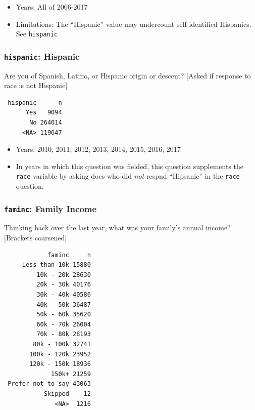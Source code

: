 \documentclass[10pt,article,oneside]{memoir}
\theoremstyle{definition}
\begin{document}
\begin{itemize}
\tightlist
\item
  Years: All of 2006-2017
\item
  Limitations: The ``Hispanic'' value may undercount self-identified
  Hispanics. See \texttt{hispanic}
\end{itemize}

\hypertarget{hispanic-hispanic}{%
\subsubsection{\texorpdfstring{\texttt{hispanic}:
Hispanic}{hispanic: Hispanic}}\label{hispanic-hispanic}}

Are you of Spanish, Latino, or Hispanic origin or descent? {[}Asked if
response to race is not Hispanic{]}

\begin{verbatim}
 hispanic      n
      Yes   9094
       No 264014
     <NA> 119647
\end{verbatim}

\begin{itemize}
\tightlist
\item
  Years: 2010, 2011, 2012, 2013, 2014, 2015, 2016, 2017
\item
  In years in which this question was fielded, this question supplements
  the \texttt{race} variable by asking does who did \emph{not} respnd
  ``Hipsanic'' in the \texttt{race} question.
\end{itemize}

\hypertarget{faminc-family-income}{%
\subsubsection{\texorpdfstring{\texttt{faminc}: Family
Income}{faminc: Family Income}}\label{faminc-family-income}}

Thinking back over the last year, what was your family's annual income?
{[}Brackets coarsened{]}

\begin{verbatim}
            faminc     n
     Less than 10k 15880
         10k - 20k 28630
         20k - 30k 40176
         30k - 40k 40586
         40k - 50k 36487
         50k - 60k 35620
         60k - 70k 26004
         70k - 80k 28193
        80k - 100k 32741
       100k - 120k 23952
       120k - 150k 18936
             150k+ 21259
 Prefer not to say 43063
           Skipped    12
              <NA>  1216
\end{verbatim}
\end{document}
